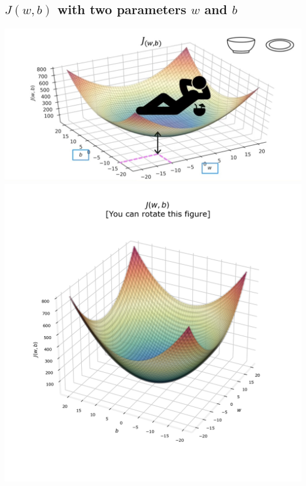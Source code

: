 \subsection*{$J(w, b)$ with two parameters $w$ and $b$}
\noindent
\includegraphics[width=\textwidth]{images/2.2_2}
\vspace{2em}
\noindent
\includegraphics[width=\textwidth]{images/2.2_6}
